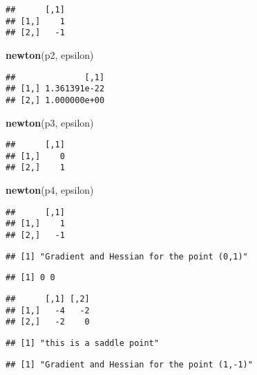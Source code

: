 \documentclass[
]{article}
\newenvironment{Shaded}{\begin{snugshade}}{\end{snugshade}}
\newcommand{\FunctionTok}[1]{\textcolor[rgb]{0.13,0.29,0.53}{\textbf{#1}}}
\newcommand{\NormalTok}[1]{#1}
\begin{document}
\begin{verbatim}
##      [,1]
## [1,]    1
## [2,]   -1
\end{verbatim}

\begin{Shaded}
\begin{Highlighting}[]
\FunctionTok{newton}\NormalTok{(p2, epsilon)}
\end{Highlighting}
\end{Shaded}

\begin{verbatim}
##              [,1]
## [1,] 1.361391e-22
## [2,] 1.000000e+00
\end{verbatim}

\begin{Shaded}
\begin{Highlighting}[]
\FunctionTok{newton}\NormalTok{(p3, epsilon)}
\end{Highlighting}
\end{Shaded}

\begin{verbatim}
##      [,1]
## [1,]    0
## [2,]    1
\end{verbatim}

\begin{Shaded}
\begin{Highlighting}[]
\FunctionTok{newton}\NormalTok{(p4, epsilon)}
\end{Highlighting}
\end{Shaded}

\begin{verbatim}
##      [,1]
## [1,]    1
## [2,]   -1
\end{verbatim}

\begin{verbatim}
## [1] "Gradient and Hessian for the point (0,1)"
\end{verbatim}

\begin{verbatim}
## [1] 0 0
\end{verbatim}

\begin{verbatim}
##      [,1] [,2]
## [1,]   -4   -2
## [2,]   -2    0
\end{verbatim}

\begin{verbatim}
## [1] "this is a saddle point"
\end{verbatim}

\begin{verbatim}
## [1] "Gradient and Hessian for the point (1,-1)"
\end{verbatim}
\end{document}
